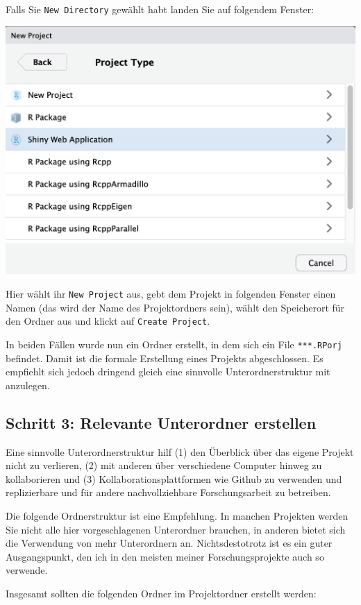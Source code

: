 \documentclass[]{book}
\begin{document}
Falls Sie \texttt{New\ Directory} gewählt habt landen Sie auf folgendem
Fenster:

\begin{center}\includegraphics[width=0.6\linewidth]{figures/r-studio-new-project-new-dir} \end{center}

Hier wählt ihr \texttt{New\ Project} aus, gebt dem Projekt in folgenden
Fenster einen Namen (das wird der Name des Projektordners sein), wählt
den Speicherort für den Ordner aus und klickt auf
\texttt{Create\ Project}.

In beiden Fällen wurde nun ein Ordner erstellt, in dem sich ein File
\texttt{***.RPorj} befindet. Damit ist die formale Erstellung eines
Projekts abgeschlossen. Es empfiehlt sich jedoch dringend gleich eine
sinnvolle Unterordnerstruktur mit anzulegen.

\subsection{Schritt 3: Relevante Unterordner
erstellen}\label{schritt-3-relevante-unterordner-erstellen}

Eine sinnvolle Unterordnerstruktur hilf (1) den Überblick über das
eigene Projekt nicht zu verlieren, (2) mit anderen über verschiedene
Computer hinweg zu kollaborieren und (3) Kollaborationsplattformen wie
Github zu verwenden und replizierbare und für andere nachvollziehbare
Forschungsarbeit zu betreiben.

Die folgende Ordnerstruktur ist eine Empfehlung. In manchen Projekten
werden Sie nicht alle hier vorgeschlagenen Unterordner brauchen, in
anderen bietet sich die Verwendung von mehr Unterordnern an.
Nichtsdestotrotz ist es ein guter Ausgangspunkt, den ich in den meisten
meiner Forschungsprojekte auch so verwende.

Insgesamt sollten die folgenden Ordner im Projektordner erstellt werden:
\end{document}

